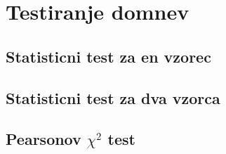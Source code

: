\section{Testiranje domnev}

\subsection{Statisticni test za en vzorec}
\subsection{Statisticni test za dva vzorca}
\subsection{Pearsonov $\chi^2$ test}